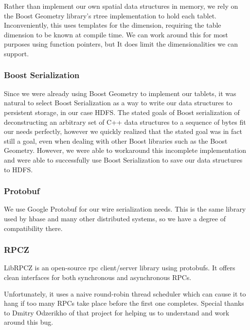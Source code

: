 \documentclass[11pt]{article}
\begin{document}
Rather than implement our own spatial data structures in memory, we rely on the Boost Geometry\cite{boost} library's rtree implementation to hold each tablet. Inconveniently, this uses templates for the dimension, requiring the table dimension to be known at compile time. We can work around this for most purposes using function pointers, but It does limit the dimensionalities we can support.

\subsubsection{Boost Serialization}

Since we were already using Boost Geometry to implement our tablets, it was natural to select Boost Serialization as a way to write our data structures to persistent storage, in our case HDFS. The stated goals of Boost serialization of deconstructing an arbitrary set of C++ data structures to a sequence of bytes fit our needs perfectly, however we quickly realized that the stated goal was in fact still a goal, even when dealing with other Boost libraries such as the Boost Geometry. However, we were able to workaround this incomplete implementation and were able to successfully use Boost Serialization to save our data structures to HDFS.

\subsubsection{Protobuf}

We use Google Protobuf\cite{protobuf} for our wire serialization needs. This is the same library used by hbase and many other distributed systems, so we have a degree of compatibility there.

\subsubsection{RPCZ}

LibRPCZ\cite{rpcz} is an open-source rpc client/server library using protobufs. It offers clean interfaces for both synchronous and asynchronous RPCs.

Unfortunately, it uses a naive round-robin thread scheduler which can cause it to hang if too many RPCs take place before the first one completes. Special thanks to Dmitry Odzerikho of that project for helping us to understand and work around this bug.
\end{document}
